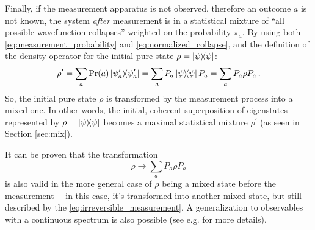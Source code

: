 Finally, if the measurement apparatus is not observed,
therefore an outcome $a$ is not known,
the system \emph{after} measurement is in a statistical mixture
of ``all possible wavefunction collapses'' weighted on the probability $\pi_{a}$.
By using both \eqref{eq:measurement_probability} and \eqref{eq:normalized_collapse},
and the definition of the density operator for the initial pure state
$\rho = \ketbra{\psi}$:
\[
  \rho^{\prime} = \sum_a \Pr(a) \ketbra{\psi^{\prime}_a} = \sum_a P_a \ketbra{\psi} P_a
    = \sum_a P_a \rho P_a \,\text{.}
\]
So, the initial pure state $\rho$ is transformed by the measurement process into a mixed one.
In other words, the initial, coherent superposition of eigenstates represented by $\rho = \ketbra{\psi}$
becomes a maximal statistical mixture $\rho^{\prime}$
(as seen in Section \ref{sec:mix}).

It can be proven that the transformation
\begin{equation}\label{eq:irreversible_measurement}
  \rho \rightarrow \sum_a P_a \rho P_a
\end{equation}
is also valid in the more general case of $\rho$ being a mixed state before the measurement
---in this case, it's transformed into another mixed state,
but still described by the \eqref{eq:irreversible_measurement}.
A generalization to observables with a continuous spectrum is also possible
(see e.g. \cite[Section 3.1.1]{PreskillNotes} for more details).
